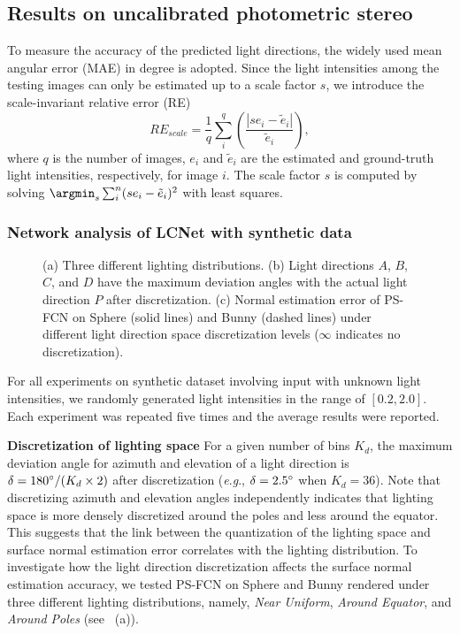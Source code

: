 \documentclass[10pt,journal,compsoc]{IEEEtran}
\newcommand{\eg}{\textit{e}.\textit{g}.}
\newcommand{\revision}[1]{#1}
\renewcommand{\paragraph}[1]{\vspace{0.2em}\noindent \textbf{#1 \hspace{0.2em}}}
\begin{document}
\subsection{Results on uncalibrated photometric stereo}

To measure the accuracy of the predicted light directions, the widely used mean angular error (MAE) in degree is adopted.
Since the light intensities among the testing images can only be estimated up to a scale factor $s$, we introduce the scale-invariant relative error (RE)
\begin{equation}
    RE_{scale} = \frac{1}{q} \sum_i^q \left(\frac{|s e_i -\tilde{e}_i|}{\tilde{e}_i} \right),
\end{equation}
where $q$ is the number of images, $e_i$ and $\tilde{e}_i$ are the estimated and ground-truth light intensities, respectively, for image $i$. The scale factor $s$ is computed by solving \hbox{$\argmin_s \sum_i^n (s e_i -\tilde{e}_i)^2$} with least squares. 

\subsubsection{Network analysis of LCNet with synthetic data}
\begin{figure}[t] \centering
    
    \caption{(a) Three different lighting distributions. (b) Light directions $A$, $B$, $C$, and $D$ have the maximum deviation angles with the actual light direction $P$ after discretization. (c) Normal estimation error of PS-FCN on {\sc Sphere} (solid lines) and {\sc Bunny} (dashed lines) under different light direction space discretization levels ($\infty$ indicates no discretization).} \label{fig:discretization}
\end{figure}

For all experiments on synthetic dataset involving input with unknown light intensities, we randomly generated light intensities in the range of $[0.2, 2.0]$. Each experiment was repeated five times and the average results were reported.

\paragraph{Discretization of lighting space}
For a given number of bins $K_d$, the maximum deviation angle for azimuth and elevation of a light direction is $\delta = 180\degree/(K_d\times 2)$ after discretization (\eg, $\delta=2.5\degree$ when $K_d=36$).
\revision{Note that discretizing azimuth and elevation angles independently indicates that lighting space is more densely discretized around the poles and less around the equator. 
This suggests that the link between the quantization of the lighting space and surface normal estimation error correlates with the lighting distribution.
To investigate how the light direction discretization affects the surface normal estimation accuracy, we tested PS-FCN on {\sc Sphere} and {\sc Bunny} rendered under three different lighting distributions, namely, \textit{Near Uniform}, \textit{Around Equator}, and \textit{Around Poles} (see \fref{fig:discretization}~(a)).}
\end{document}
